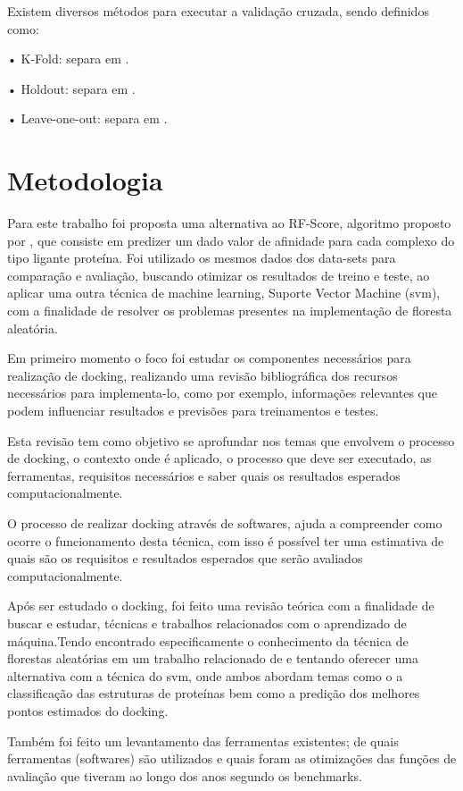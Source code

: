 \documentclass[tcc, capa]{texucpel}
\begin{document}
Existem diversos métodos para executar a validação cruzada, sendo definidos como:

• K-Fold: separa em .

• Holdout: separa em .

• Leave-one-out: separa em .


\chapter{Metodologia}
Para este trabalho foi proposta uma alternativa ao RF-Score, algoritmo proposto por \cite{ballester2010machine}, que consiste em predizer um dado valor de afinidade para cada complexo do tipo ligante proteína.
Foi utilizado os mesmos dados dos data-sets para comparação e avaliação, buscando otimizar os resultados de treino e teste, ao aplicar uma outra técnica de machine learning, Suporte Vector Machine (svm), com a finalidade de resolver os problemas presentes na implementação de floresta aleatória.

Em primeiro momento o foco foi estudar os componentes necessários para realização de docking, realizando uma revisão bibliográfica dos recursos necessários para implementa-lo, como por exemplo, informações relevantes que podem influenciar resultados e previsões para treinamentos e testes. 

Esta revisão tem como objetivo se aprofundar nos temas que envolvem  o processo de docking, o contexto onde é aplicado, o processo que deve ser executado, as ferramentas, requisitos necessários  e saber quais os resultados esperados computacionalmente. 

O processo de realizar docking através de softwares, ajuda a compreender como ocorre o funcionamento desta técnica, com isso é possível ter uma estimativa de quais são os requisitos e resultados esperados que serão avaliados computacionalmente.

Após ser estudado o docking, foi feito uma revisão teórica com a finalidade de buscar e estudar, técnicas e trabalhos relacionados com o aprendizado de máquina.Tendo encontrado especificamente o conhecimento da técnica de florestas aleatórias em um trabalho relacionado de \cite{ballester2010machine} e tentando oferecer uma alternativa com a técnica do svm, onde ambos abordam temas como o a classificação das estruturas de proteínas bem como a predição dos melhores pontos estimados do docking.

Também foi feito um levantamento das ferramentas existentes; de quais ferramentas (softwares) são utilizados e quais foram as otimizações das funções de avaliação que tiveram ao longo dos anos segundo os benchmarks.
\end{document}

